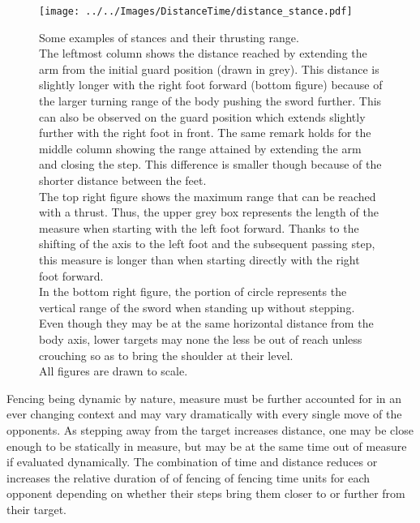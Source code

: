 \begin{figure}[h]
\centering
	\texttt{[image: ../../Images/DistanceTime/distance\_stance.pdf]}
	\caption[Stance and measure]{Some examples of stances and their thrusting range.\\
	The leftmost column shows the distance reached by extending the arm from the initial guard position (drawn in grey). This distance is slightly longer with the right foot forward (bottom figure) because of the larger turning range of the body pushing the sword further. This can also be observed on the guard position which extends slightly further with the right foot in front. The same remark holds for the middle column showing the range attained by extending the arm and closing the step. This difference is smaller though because of the shorter distance between the feet.\\
	The top right figure shows the maximum range that can be reached with a thrust. Thus, the upper grey box represents the length of the measure when starting with the left foot forward. Thanks to the shifting of the axis to the left foot and the subsequent passing step, this measure is longer than when starting directly with the right foot forward.\\
	In the bottom right figure, the portion of circle represents the vertical range of the sword when standing up without stepping. Even though they may be at the same horizontal distance from the body axis, lower targets may none the less be out of reach unless crouching so as to bring the shoulder at their level.\\
	All figures are drawn to scale.}
	\label{fig:distance_stance}
\end{figure}

Fencing being dynamic by nature, measure must be further accounted for in an ever changing context and may vary dramatically with every single move of the opponents.
As stepping away from the target increases distance, one may be close enough to be statically in measure, but may be at the same time out of measure if evaluated dynamically.
The combination of time and distance reduces or increases the relative duration of of fencing of fencing time units for each opponent depending on whether their steps bring them closer to or further from their target.


